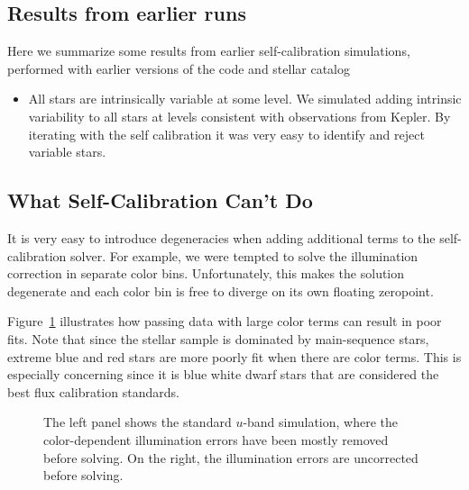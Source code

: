 \documentclass[12pt,preprint]{aastex}
\begin{document}
\subsection{Results from earlier runs}
Here we summarize some results from earlier self-calibration simulations, performed with earlier versions of the code and stellar catalog

\begin{itemize}
\item{All stars are intrinsically variable at some level.  We simulated adding intrinsic variability to all stars at levels consistent with observations from Kepler.  By iterating with the self calibration it was very easy to identify and reject variable stars.}
\end{itemize}

\subsection{What Self-Calibration Can't Do}

It is very easy to introduce degeneracies when adding additional terms to the self-calibration solver.  For example, we were tempted to solve the illumination correction in separate color bins.  Unfortunately, this makes the solution degenerate and each color bin is free to diverge on its own floating zeropoint.  

Figure~\ref{fig:badcolor} illustrates how passing data with large color terms can result in poor fits.  Note that since the stellar sample is dominated by main-sequence stars, extreme blue and red stars are more poorly fit when there are color terms.  This is especially concerning since it is blue white dwarf stars that are considered the best flux calibration standards.

\begin{figure}
\caption{The left panel shows the standard $u$-band simulation, where the color-dependent illumination errors have been mostly removed before solving.  On the right,  the illumination errors are uncorrected before solving.  \label{fig:badcolor}}
\end{figure}
\end{document}
